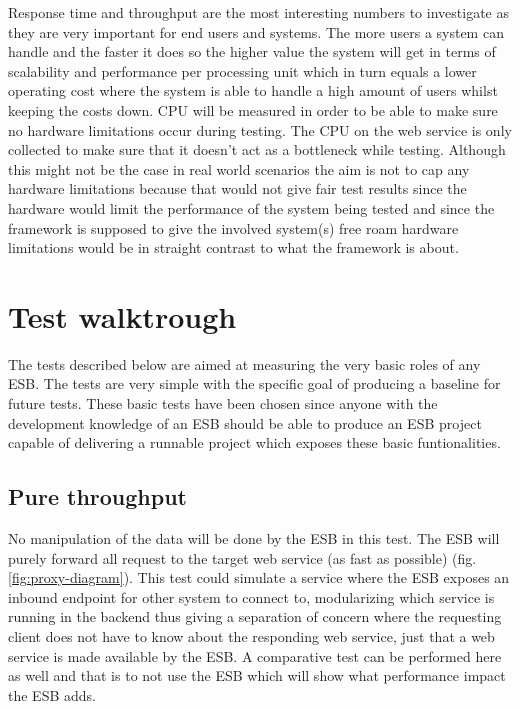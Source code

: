 Response time and throughput are the most interesting numbers to investigate as they are very important for end users and systems. The more users a system can handle and the faster it does so the higher value the system will get in terms of scalability and performance per processing unit which in turn equals a lower operating cost where the system is able to handle a high amount of users whilst keeping the costs down.
CPU  will be measured in order to be able to make sure no hardware limitations occur during testing. The CPU on the web service is only collected to make sure that it doesn't act as a bottleneck while testing. Although this might not be the case in real world scenarios the aim is not to cap any hardware limitations because that would not give fair test results since the hardware would limit the performance of the system being tested and since the framework is supposed to give the involved system(s) free roam hardware limitations would be in straight contrast to what the framework is about.

\section{Test walktrough}
The tests described below are aimed at measuring the very basic roles of any ESB. 
The tests are very simple with the specific goal of producing a baseline for future tests. 
These basic tests have been chosen since anyone with the development knowledge of an ESB should be able to produce an ESB project capable of delivering a runnable project which exposes these basic funtionalities.

\subsection{Pure throughput}
No manipulation of the data will be done by the ESB in this test. The ESB will purely forward all request to the target web service (as fast as possible) (fig.\ref{fig:proxy-diagram}). 
This test could simulate a service where the ESB exposes an inbound endpoint for other system to connect to, modularizing which service is running in the backend thus giving a separation of concern where the requesting client does not have to know about the responding web service, just that a web service is made available by the ESB.
A comparative test can be performed here as well and that is to not use the ESB which will show what performance impact the ESB adds. 

